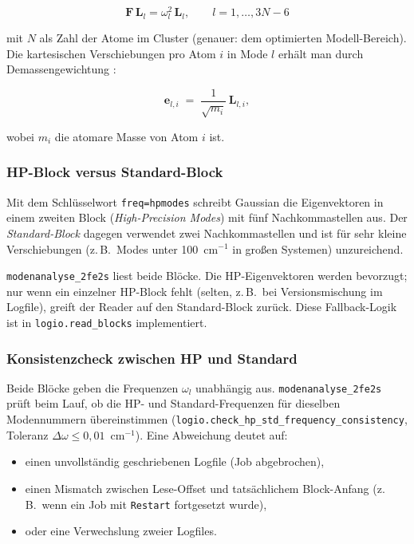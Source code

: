 \documentclass[11pt,a4paper,twoside]{article}
\newcommand{\evec}{\mathbf{e}}
\theoremstyle{remark}
\begin{document}
\begin{equation}
  \mathbf{F}\,\mathbf{L}_l = \omega_l^2 \, \mathbf{L}_l ,
  \qquad l = 1, \ldots, 3N-6
  \label{eq:fg-eigenproblem}
\end{equation}

mit $N$ als Zahl der Atome im Cluster (genauer: dem optimierten
Modell-Bereich). Die kartesischen Verschiebungen pro Atom $i$ in
Mode $l$ erh\"alt man durch Demassengewichtung
\cite{WilsonDeciusCross1955}:

\begin{equation}
  \evec_{l,i} \;=\; \frac{1}{\sqrt{m_i}}\,\mathbf{L}_{l,i} ,
  \label{eq:demass}
\end{equation}

wobei $m_i$ die atomare Masse von Atom $i$ ist.

\subsubsection*{HP-Block versus Standard-Block}

Mit dem Schl\"usselwort \texttt{freq=hpmodes} schreibt Gaussian die
Eigenvektoren in einem zweiten Block (\emph{High-Precision Modes}) mit
f\"unf Nachkommastellen aus. Der \emph{Standard-Block} dagegen
verwendet zwei Nachkommastellen und ist f\"ur sehr kleine
Verschiebungen (z.\,B.\ Modes unter 100~cm$^{-1}$ in gro\ss en
Systemen) unzureichend.

\texttt{modenanalyse\_2fe2s} liest beide Bl\"ocke. Die HP-Eigenvektoren
werden bevorzugt; nur wenn ein einzelner HP-Block fehlt (selten, z.\,B.\
bei Versionsmischung im Logfile), greift der Reader auf den
Standard-Block zur\"uck. Diese Fallback-Logik ist in
\texttt{logio.read\_blocks} implementiert.

\subsubsection*{Konsistenzcheck zwischen HP und Standard}
\label{sec:hp-std-check}

Beide Bl\"ocke geben die Frequenzen $\omega_l$ unabh\"angig aus.
\texttt{modenanalyse\_2fe2s} pr\"uft beim Lauf, ob die HP- und
Standard-Frequenzen f\"ur dieselben Modennummern \"ubereinstimmen
(\texttt{logio.check\_hp\_std\_frequency\_consistency}, Toleranz
$\Delta\omega \leq 0{,}01$~cm$^{-1}$). Eine Abweichung deutet auf:

\begin{itemize}
  \item einen unvollst\"andig geschriebenen Logfile (Job abgebrochen),
  \item einen Mismatch zwischen Lese-Offset und tats\"achlichem
        Block-Anfang (z.\,B.\ wenn ein Job mit \texttt{Restart} fortgesetzt
        wurde),
  \item oder eine Verwechslung zweier Logfiles.
\end{itemize}
\end{document}
